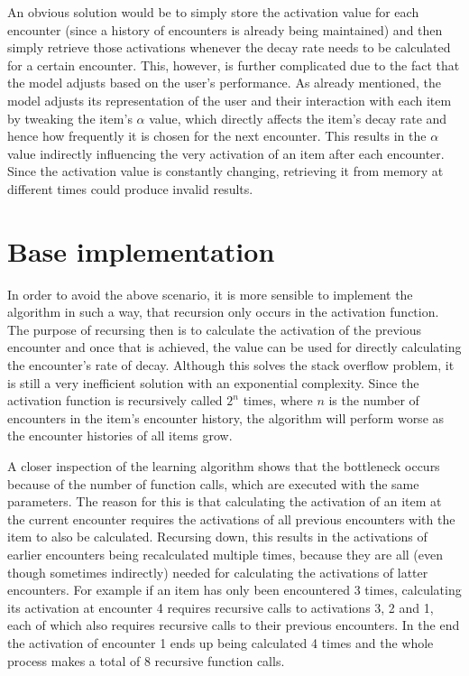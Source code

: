 \documentclass[a4paper]{report}
\begin{document}
An obvious solution would be to simply store the activation value for each encounter (since a history of encounters is already being maintained) and then simply retrieve those activations whenever the decay rate needs to be calculated for a certain encounter. This, however, is further complicated due to the fact that the model adjusts based on the user's performance. As already mentioned, the model adjusts its representation of the user and their interaction with each item by tweaking the item's $\alpha$ value, which directly affects the item's decay rate and hence how frequently it is chosen for the next encounter. This results in the $\alpha$ value indirectly influencing the very activation of an item after each encounter. Since the activation value is constantly changing, retrieving it from memory at different times could produce invalid results.

\section{Base implementation}
In order to avoid the above scenario, it is more sensible to implement the algorithm in such a way, that recursion only occurs in the activation function. The purpose of recursing then is to calculate the activation of the previous encounter and once that is achieved, the value can be used for directly calculating the encounter's rate of decay. Although this solves the stack overflow problem, it is still a very inefficient solution with an exponential complexity. Since the activation function is recursively called $2^n$ times, where $n$ is the number of encounters in the item's encounter history, the algorithm will perform worse as the encounter histories of all items grow.

A closer inspection of the learning algorithm shows that the bottleneck occurs because of the number of function calls, which are executed with the same parameters. The reason for this is that calculating the activation of an item at the current encounter requires the activations of all previous encounters with the item to also be calculated. Recursing down, this results in the activations of earlier encounters being recalculated multiple times, because they are all (even though sometimes indirectly) needed for calculating the activations of latter encounters. For example if an item has only been encountered 3 times, calculating its activation at encounter 4 requires recursive calls to activations 3, 2 and 1, each of which also requires recursive calls to their previous encounters. In the end the activation of encounter 1 ends up being calculated 4 times and the whole process makes a total of 8 recursive function calls.
\end{document}
